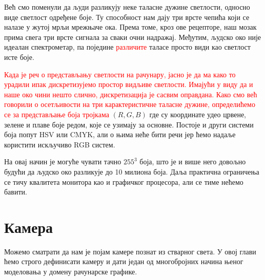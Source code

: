 \documentclass[12pt, a4paper, twoside]{book}
\numberwithin{equation}{chapter}
\numberwithin{theorem}{section}
\numberwithin{definition}{section}
\numberwithin{definitionChapter}{chapter}
\begin{document}
Већ смо поменули да људи разликују неке таласне дужине светлости, односно виде светлост одређене боје. Ту
способност нам дају три врсте чепића који се налазе у жутој мрљи мрежњаче ока. Према томе, кроз ове рецепторе,
наш мозак прима свега три врсте сигнала за сваки очни надражај. Међутим, људско око није идеалан спектрометар, па
поједине \textcolor{red}{различите} таласе просто види као светлост исте боје.

\textcolor{red}{Када је реч о представљању светлости на рачунару, јасно је да ма како то урадили ипак дискретизујемо простор
видљиве светлости. Имајући у виду да и наше око чини нешто слично, дискретизација је сасвим оправдана. Како
смо већ говорили о осетљивости на три карактеристичне таласне дужине, определићемо се за представљање боја
тројкама} $(R, G, B)$ где су координате удео црвене, зелене и плаве боје редом, које се узимају за основне.
Постоје и други системи боја попут HSV или CMYK, али о њима неће бити речи јер ћемо надаље користити искључиво RGB систем.

На овај начин је могуће чувати тачно $255^3$ боја, што је и више него довољно будући да људско око разликује до 10
милиона боја. Даља практична ограничења се тичу квалитета монитора као и графичког процесора, али се тиме нећемо бавити.



\section{Камера}
Можемо сматрати да нам је појам камере познат из стварног света. У овој глави
ћемо строго дефинисати камеру и дати један од многобројних начина њеног
моделовања у домену рачунарске графике.
\end{document}
